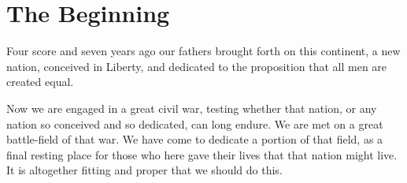 
\section{The Beginning}
 
Four score and seven years ago our fathers brought forth on this continent, a new nation, conceived in Liberty, and dedicated to the proposition that all men are created equal.

Now we are engaged in a great civil war, testing whether that nation, or any nation so conceived and so dedicated, can long endure. We are met on a great battle-field of that war. We have come to dedicate a portion of that field, as a final resting place for those who here gave their lives that that nation might live. It is altogether fitting and proper that we should do this. 



